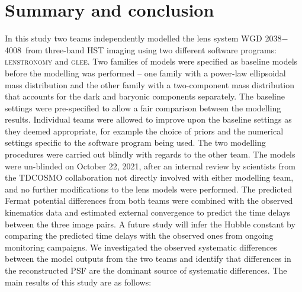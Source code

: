 \documentclass[longauth]{aa}
\newcommand{\lensname}{WGD 2038$-$4008}
\newcommand{\ajsiv}[1]{{{#1}}}
\newcommand{\kw}[1]{{{#1}}}
\begin{document}
\section{Summary and conclusion} \label{sec:conclusion}

In this study two teams independently modelled the lens system \lensname\ from three-band HST imaging using two different software programs: \textsc{lenstronomy} and \textsc{glee}. Two families of models were specified as baseline models before the modelling was performed -- one family with a power-law ellipsoidal mass distribution and the other family with a two-component mass distribution that accounts for the dark and baryonic components separately. The baseline settings were pre-specified to allow a fair comparison between the modelling results. Individual teams were allowed to improve upon the baseline settings as they deemed appropriate, for example the choice of priors and the numerical settings specific to the software program being used. The two modelling procedures were carried out blindly with regards to the other team. The models were un-blinded on October 22, 2021, after an internal review \ajsiv{by scientists from the TDCOSMO collaboration not directly involved with either modelling team}, and no further modifications to the lens models were performed. The predicted Fermat potential differences from both teams were combined with the observed kinematics data and estimated external convergence to predict the time delays between the three image pairs. A future study will infer the Hubble constant by comparing the predicted time delays with the observed ones from ongoing monitoring campaigns. We investigated the observed systematic differences between the model outputs from the two teams and identify that \kw{differences in} the reconstructed PSF are the dominant source of systematic differences. The main results of this study are as follows:
%
\end{document}
